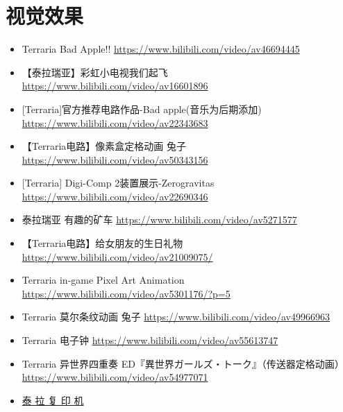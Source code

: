 \section{视觉效果}
\begin{itemize}
\item Terraria Bad Apple!! \url{https://www.bilibili.com/video/av46694445}
\item 【泰拉瑞亚】彩虹小电视我们起飞 \url{https://www.bilibili.com/video/av16601896}
\item {[}Terraria]官方推荐电路作品-Bad apple(音乐为后期添加) \url{https://www.bilibili.com/video/av22343683}
\item 【Terraria电路】像素盒定格动画 兔子 \url{https://www.bilibili.com/video/av50343156}
\item {[}Terraria] Digi-Comp 2装置展示-Zerogravitas \url{https://www.bilibili.com/video/av22690346}
\item 泰拉瑞亚 有趣的矿车 \url{https://www.bilibili.com/video/av5271577}
\item 【Terraria电路】给女朋友的生日礼物 \url{https://www.bilibili.com/video/av21009075/}
\item Terraria in-game Pixel Art Animation \url{https://www.bilibili.com/video/av5301176/?p=5}
\item Terraria 莫尔条纹动画 兔子 \url{https://www.bilibili.com/video/av49966963}
\item Terraria 电子钟 \url{https://www.bilibili.com/video/av55613747}
\item Terraria 异世界四重奏 ED『異世界ガールズ・トーク』（传送器定格动画） \url{https://www.bilibili.com/video/av54977071}
\item \href{https://www.bilibili.com/video/BV1ME411P7QD}{泰 拉 复 印 机}
\end{itemize}

